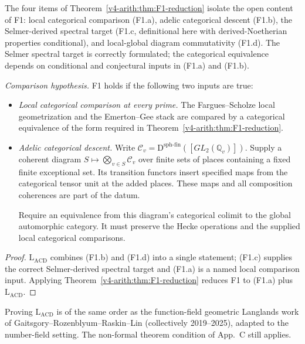 \begin{remark}
\label{v4-arith:cl:rem:F1-form}
The four items of Theorem~\ref{v4-arith:thm:F1-reduction} isolate the open
content of F1: local categorical comparison (F1.a), adelic categorical
descent (F1.b), the Selmer-derived spectral target (F1.c, definitional
here with derived-Noetherian properties conditional), and
local-global diagram commutativity (F1.d). The Selmer spectral target
is correctly formulated; the categorical equivalence depends on
conditional and conjectural inputs in (F1.a) and (F1.b).
\end{remark}

\begin{corollary}
\label{v4-arith:cl:cor:F1-single-lemma}
\emph{Comparison hypothesis.} F1 holds if the following two inputs are
true:
\begin{itemize}
\item[\textbf{(F1.a)}] \emph{Local categorical comparison at every
prime.} The Fargues--Scholze local geometrization and the
Emerton--Gee stack are compared by a categorical equivalence of the
form required in Theorem~\ref{v4-arith:thm:F1-reduction}.
\item[\textbf{(L\(_{\mathrm{ACD}}\))}] \emph{Adelic categorical descent.}
Write
\(\mathcal C_v=\mathrm{D}^{\mathrm{sph\text{-}fin}}([GL_2(\mathbb Q_v)])\).
Supply a coherent diagram \(S\mapsto\bigotimes_{v\in S}\mathcal C_v\)
over finite sets of places containing a fixed finite exceptional set.
Its transition functors insert specified maps from the categorical
tensor unit at the added places. These maps and all composition
coherences are part of the datum.

Require an equivalence from this diagram's categorical colimit
to the global automorphic category. It must preserve the Hecke
operations and the supplied local categorical comparisons.
\end{itemize}
\end{corollary}

\begin{proof}
\(\mathrm{L}_{\mathrm{ACD}}\) combines (F1.b) and (F1.d) into a single
statement; (F1.c) supplies the correct Selmer-derived spectral
target and (F1.a) is a named local comparison input. Applying
Theorem~\ref{v4-arith:thm:F1-reduction} reduces F1
to (F1.a) plus \(\mathrm{L}_{\mathrm{ACD}}\).
\end{proof}

\begin{remark}
\label{v4-arith:cl:rem:F1-substantial}
Proving \(\mathrm{L}_{\mathrm{ACD}}\) is of the same order as the
function-field geometric Langlands work of
Gaitsgory--Rozenblyum--Raskin--Lin (collectively 2019--2025),
adapted to the number-field setting. The non-formal theorem condition of
App.~C still applies.
\end{remark}

